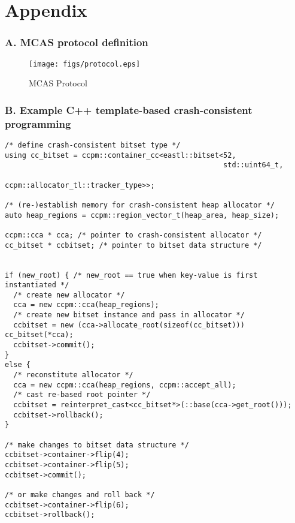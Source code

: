 
\appendix
\onecolumn 
\section*{Appendix}

\subsubsection*{A. MCAS protocol definition}

\begin{figure}[h]
\centering
\texttt{[image: figs/protocol.eps]}
\caption{MCAS Protocol}
\label{appendix:protocol}
\end{figure}

\newpage
\subsubsection*{B. Example C++ template-based crash-consistent programming}
\label{appendix:ccpm}

\begin{lstlisting}[frame=none]
/* define crash-consistent bitset type */      
using cc_bitset = ccpm::container_cc<eastl::bitset<52,
                                                   std::uint64_t,
                                                   ccpm::allocator_tl::tracker_type>>;

/* (re-)establish memory for crash-consistent heap allocator */                                                   
auto heap_regions = ccpm::region_vector_t(heap_area, heap_size);

ccpm::cca * cca; /* pointer to crash-consistent allocator */
cc_bitset * ccbitset; /* pointer to bitset data structure */


if (new_root) { /* new_root == true when key-value is first instantiated */
  /* create new allocator */
  cca = new ccpm::cca(heap_regions);
  /* create new bitset instance and pass in allocator */
  ccbitset = new (cca->allocate_root(sizeof(cc_bitset))) cc_bitset(*cca);
  ccbitset->commit();
}
else {
  /* reconstitute allocator */
  cca = new ccpm::cca(heap_regions, ccpm::accept_all);
  /* cast re-based root pointer */
  ccbitset = reinterpret_cast<cc_bitset*>(::base(cca->get_root()));
  ccbitset->rollback();
}

/* make changes to bitset data structure */
ccbitset->container->flip(4);
ccbitset->container->flip(5);
ccbitset->commit();

/* or make changes and roll back */
ccbitset->container->flip(6);
ccbitset->rollback();
\end{lstlisting}



